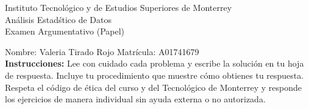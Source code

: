 \documentclass[10pt]{report}
\begin{document}
\newpage



\begin{center}
{\large Instituto Tecnol\'{o}gico y de Estudios Superiores de Monterrey \\
An\'alisis Estad\'stico de Datos } \\
Examen Argumentativo (Papel)
\end{center}

Nombre: \underline{\hspace*{.2in}}
Valeria Tirado Rojo
\underline{\hspace*{.2in}} \quad Matr\'icula:\underline{\hspace*{.2in}}
A01741679
\underline{\hspace*{.2in}} \\

{\bf Instrucciones:} Lee con cuidado cada problema y escribe la soluci\'on
en tu hoja de respuesta. Incluye tu procedimiento que muestre c\'omo obtienes tu respuesta.  Respeta el c\'odigo de \'etica del curso y del Tecnol\'ogico de Monterrey y responde los ejercicios de manera individual sin ayuda externa o no autorizada.
\end{document}
